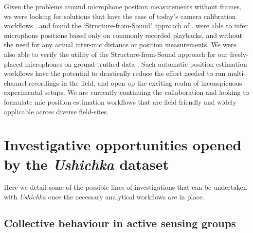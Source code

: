 \documentclass[
]{book}
\begin{document}
Given the problems around microphone position measurements without frames, we were looking for solutions that have the ease of today's camera calibration workflows \citep[eg.][]{Theriault2014}, and found the `Structure-from-Sound' approach of \citet{zhayida2016automatic}. \citet{zhayida2016automatic} were able to infer microphone positions based only on commonly recorded playbacks, and without the need for any actual inter-mic distance or position measurements. We were also able to verify the utility of the Structure-from-Sound approach for our freely-placed microphones on ground-truthed data \citep[also see SI \ref{automicpos}]{sfs_cotdoa}. Such automatic position estimation workflows have the potential to drastically reduce the effort needed to run multi-channel recordings in the field, and open up the exciting realm of inconspicuous experimental setups. We are currently continuing the collaboration and looking to formulate mic position estimation workflows that are field-friendly and widely applicable across diverse field-sites.

\hypertarget{investigative-opportunities-opened-by-the-ushichka-dataset}{%
\section{\texorpdfstring{Investigative opportunities opened by the \emph{Ushichka} dataset}{Investigative opportunities opened by the Ushichka dataset}}\label{investigative-opportunities-opened-by-the-ushichka-dataset}}

Here we detail some of the possible lines of investigations that can be undertaken with \emph{Ushichka} once the necessary analytical workflows are in place.

\hypertarget{collective-behaviour-in-active-sensing-groups}{%
\subsection{Collective behaviour in active sensing groups}\label{collective-behaviour-in-active-sensing-groups}}
\end{document}
